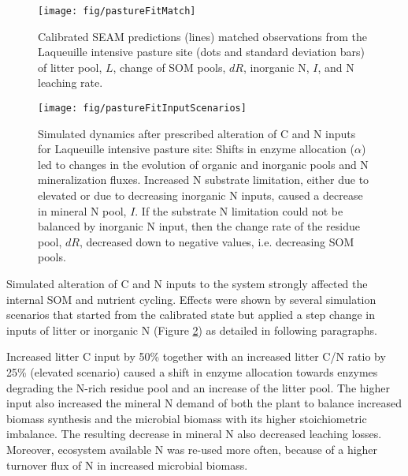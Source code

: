 \begin{figure}[t] \vspace*{2mm}
\begin{center}
\texttt{[image: fig/pastureFitMatch]} 
\end{center}
\caption{
Calibrated SEAM predictions (lines)  matched observations from the
Laqueuille intensive pasture site (dots and standard deviation bars) of
litter pool, $L$, change of SOM pools, $dR$, inorganic N, $I$, and N leaching rate.
\label{fig:pastureFitMatch}} 
\end{figure}

\begin{figure}[t] \vspace*{2mm}
\begin{center}
\texttt{[image: fig/pastureFitInputScenarios]} 
\end{center}
\caption{
Simulated dynamics after prescribed alteration of C and N inputs for Laqueuille
intensive pasture site: Shifts in enzyme allocation ($\alpha$) led to changes in
the evolution of organic and inorganic pools and N mineralization
fluxes. 
Increased N substrate limitation, either due to elevated  or due to
decreasing inorganic N inputs, caused a decrease in mineral N pool, $I$. If the
substrate N limitation could not be balanced by inorganic N input, then the
change rate of the residue pool, $dR$, decreased down to negative values, i.e.
decreasing SOM pools.
\label{fig:pastureFitScen}}  
\end{figure}   
   
Simulated alteration of C and N inputs to the system strongly affected the
internal SOM and nutrient cycling. Effects were shown by several
simulation scenarios that started from the calibrated state but applied a step change in
inputs of litter or inorganic N (Figure \ref{fig:pastureFitScen}) as detailed
in following paragraphs.

Increased litter C input by 50\% together with an increased litter C/N ratio by
25\% (elevated  scenario) caused a shift in enzyme allocation towards
enzymes degrading the N-rich residue pool and an increase of the litter pool.
The higher input also increased the mineral N demand of both the plant to
balance increased biomass synthesis and the microbial biomass with its higher
stoichiometric imbalance. The resulting decrease in mineral N also decreased
leaching losses. Moreover, ecosystem available N was re-used more often, because
of a higher turnover flux of N in increased microbial biomass.

